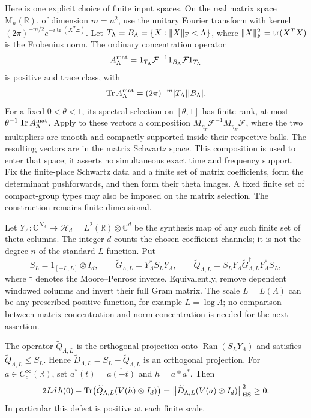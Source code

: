 Here is one explicit choice of finite input spaces. On the real matrix
space $\mathrm M_n(\mathbb R)$, of dimension $m=n^2$, use the unitary
Fourier transform with kernel $(2\pi)^{-m/2}e^{-i\operatorname{tr}(X^T\Xi)}$.
Let $T_\Lambda=B_\Lambda=\{X:\|X\|_{\rm F}<\Lambda\}$,
where $\|X\|_{\rm F}^2=\operatorname{tr}(X^TX)$ is the Frobenius norm. The ordinary concentration operator
\[
 A_\Lambda^{\rm mat}
  =1_{T_\Lambda}\mathcal F^{-1}1_{B_\Lambda}
                         \mathcal F1_{T_\Lambda}
\]
is positive and trace class, with
\[
 \operatorname{Tr} A_\Lambda^{\rm mat}
       =(2\pi)^{-m}|T_\Lambda||B_\Lambda|.
\]
For a fixed $0<\theta<1$, its spectral selection on $[\theta,1]$
has finite rank, at most $\theta^{-1}\operatorname{Tr} A_\Lambda^{\rm mat}$.
Apply to these vectors a composition
$M_{\eta_T}\mathcal F^{-1}M_{\eta_B}\mathcal F$, where the two
multipliers are smooth and compactly supported inside their
respective balls. The resulting vectors are in the matrix Schwartz
space. This composition is used to enter that space; it asserts no
simultaneous exact time and frequency support. Fix the finite-place
Schwartz data and a finite set of matrix coefficients, form the
determinant pushforwards, and then form their theta images. A fixed
finite set of compact-group types may also be imposed on the matrix
selection. The construction remains finite dimensional.

Let $Y_\Lambda:\mathbb C^{N_\Lambda}\longrightarrow
\mathcal H_d=L^2(\mathbb R)\otimes\mathbb C^d$ be the synthesis map
of any such finite set of theta columns. The integer $d$ counts the
chosen coefficient channels; it is not the degree $n$ of the
standard $L$-function. Put
\[
 S_L=1_{[-L,L]}\otimes I_d,\qquad
 \widetilde G_{\Lambda,L}=Y_\Lambda^*S_LY_\Lambda,\qquad
 \widetilde Q_{\Lambda,L}
 =S_LY_\Lambda\widetilde G_{\Lambda,L}^{\dagger}
                         Y_\Lambda^*S_L ,
\]
where $\dagger$ denotes the Moore--Penrose inverse. Equivalently,
remove dependent windowed columns and invert their full Gram
matrix. The scale $L=L(\Lambda)$ can be any prescribed positive
function, for example $L=\log\Lambda$; no comparison between matrix
concentration and norm concentration is needed for the next assertion.

\begin{proposition}
\label{glnw:positive}
The operator $\widetilde Q_{\Lambda,L}$ is the orthogonal projection
onto $\operatorname{Ran}(S_LY_\Lambda)$ and satisfies
$\widetilde Q_{\Lambda,L}\leq S_L$. Hence
$\widetilde D_{\Lambda,L}=S_L-\widetilde Q_{\Lambda,L}$ is an
orthogonal projection. For $a\in C_c^\infty(\mathbb R)$, set
$a^*(t)=\overline{a(-t)}$ and $h=a*a^*$. Then
\begin{equation}\label{glnw:positive-trace}
 2Ld\,h(0)
 -\operatorname{Tr}\bigl(\widetilde Q_{\Lambda,L}(V(h)\otimes I_d)\bigr)
 =\bigl\|\widetilde D_{\Lambda,L}
                   (V(a)\otimes I_d)\bigr\|_{\mathrm{HS}}^2
 \geq0.
\end{equation}
In particular this defect is positive at each finite scale.
\end{proposition}


